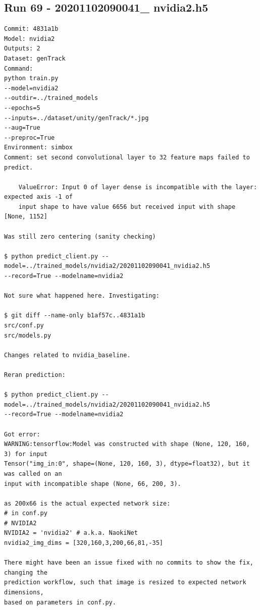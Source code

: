 \subsection{Run 69 - 20201102090041\_ nvidia2.h5}
\label{app_res:69}
\begin{verbatim}
Commit: 4831a1b
Model: nvidia2
Outputs: 2
Dataset: genTrack
Command:
python train.py
--model=nvidia2
--outdir=../trained_models
--epochs=5
--inputs=../dataset/unity/genTrack/*.jpg
--aug=True
--preproc=True
Environment: simbox
Comment: set second convolutional layer to 32 feature maps failed to predict.

    ValueError: Input 0 of layer dense is incompatible with the layer: expected axis -1 of
    input shape to have value 6656 but received input with shape [None, 1152]

Was still zero centering (sanity checking)

$ python predict_client.py --model=../trained_models/nvidia2/20201102090041_nvidia2.h5 
--record=True --modelname=nvidia2

Not sure what happened here. Investigating:

$ git diff --name-only b1af57c..4831a1b
src/conf.py
src/models.py

Changes related to nvidia_baseline.

Reran prediction:

$ python predict_client.py --model=../trained_models/nvidia2/20201102090041_nvidia2.h5
--record=True --modelname=nvidia2

Got error:
WARNING:tensorflow:Model was constructed with shape (None, 120, 160, 3) for input
Tensor("img_in:0", shape=(None, 120, 160, 3), dtype=float32), but it was called on an
input with incompatible shape (None, 66, 200, 3).

as 200x66 is the actual expected network size:
# in conf.py
# NVIDIA2
NVIDIA2 = 'nvidia2' # a.k.a. NaokiNet
nvidia2_img_dims = [320,160,3,200,66,81,-35]

There might have been an issue fixed with no commits to show the fix, changing the 
prediction workflow, such that image is resized to expected network dimensions,
based on parameters in conf.py.


\end{verbatim}

